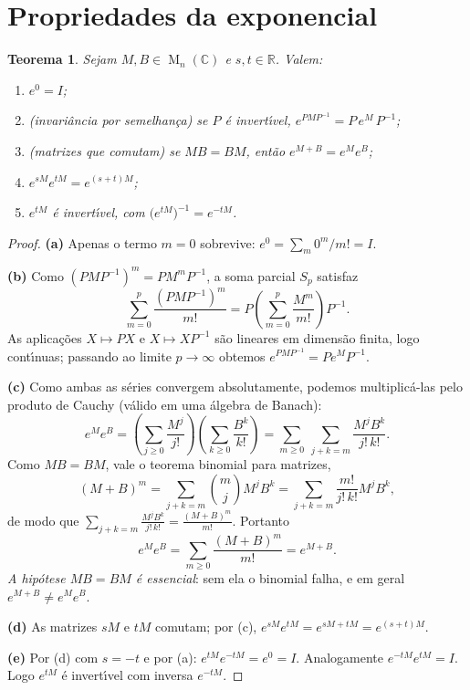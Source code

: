 \documentclass[11pt,a4paper]{amsart}
\newcommand{\R}{\mathbb{R}}
\newcommand{\C}{\mathbb{C}}
\DeclareMathOperator{\Mat}{M}
\theoremstyle{plain}
\newtheorem{teorema}{Teorema}[section]
\theoremstyle{definition}
\theoremstyle{remark}
\begin{document}
\section{Propriedades da exponencial}
\label{sec:prop}

\begin{teorema}\label{thm:propriedades}
Sejam $M,B\in\Mat_n(\C)$ e $s,t\in\R$. Valem:
\begin{enumerate}[label=\textup{(\alph*)}]
  \item $e^{0}=I$;
  \item \textup{(invari\^ancia por semelhan\c{c}a)} se $P$ \'e invert\'\i vel,
        $e^{PMP^{-1}} = P\,e^{M}\,P^{-1}$;
  \item \textup{(matrizes que comutam)} se $MB=BM$, ent\~ao
        $e^{M+B}=e^{M}e^{B}$;
  \item $e^{sM}e^{tM}=e^{(s+t)M}$;
  \item $e^{tM}$ \'e invert\'\i vel, com $\big(e^{tM}\big)^{-1}=e^{-tM}$.
\end{enumerate}
\end{teorema}

\begin{proof}
\textbf{(a)} Apenas o termo $m=0$ sobrevive: $e^0=\sum_m 0^m/m! = I$.

\medskip
\textbf{(b)} Como $(PMP^{-1})^m = P M^m P^{-1}$, a soma parcial $S_p$ satisfaz
\[
  \sum_{m=0}^{p}\frac{(PMP^{-1})^m}{m!}
  = P\left(\sum_{m=0}^{p}\frac{M^m}{m!}\right)P^{-1}.
\]
As aplica\c{c}\~oes $X\mapsto PX$ e $X\mapsto XP^{-1}$ s\~ao lineares em
dimens\~ao finita, logo cont\'\i nuas; passando ao limite $p\to\infty$ obtemos
$e^{PMP^{-1}}=Pe^{M}P^{-1}$.

\medskip
\textbf{(c)} Como ambas as s\'eries convergem absolutamente, podemos
multiplic\'a-las pelo produto de Cauchy (v\'alido em uma \'algebra de Banach):
\[
  e^{M}e^{B}
  = \left(\sum_{j\ge0}\frac{M^j}{j!}\right)\!\left(\sum_{k\ge0}\frac{B^k}{k!}\right)
  = \sum_{m\ge0}\ \sum_{j+k=m}\frac{M^j B^k}{j!\,k!}.
\]
Como $MB=BM$, vale o teorema binomial para matrizes,
\[
  (M+B)^m = \sum_{j+k=m}\binom{m}{j}M^j B^k
          = \sum_{j+k=m}\frac{m!}{j!\,k!}M^j B^k,
\]
de modo que $\sum_{j+k=m}\frac{M^jB^k}{j!\,k!} = \frac{(M+B)^m}{m!}$. Portanto
\[
  e^{M}e^{B} = \sum_{m\ge0}\frac{(M+B)^m}{m!} = e^{M+B}.
\]
\emph{A hip\'otese $MB=BM$ \'e essencial}: sem ela o binomial falha, e em geral
$e^{M+B}\neq e^Me^B$.

\medskip
\textbf{(d)} As matrizes $sM$ e $tM$ comutam; por (c),
$e^{sM}e^{tM}=e^{sM+tM}=e^{(s+t)M}$.

\medskip
\textbf{(e)} Por (d) com $s=-t$ e por (a):
$e^{tM}e^{-tM}=e^{0}=I$. Analogamente $e^{-tM}e^{tM}=I$. Logo $e^{tM}$ \'e
invert\'\i vel com inversa $e^{-tM}$.
\end{proof}
\end{document}
